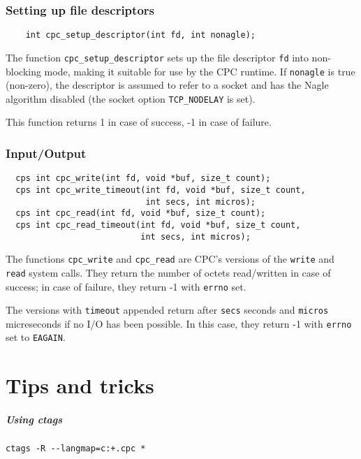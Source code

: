 \documentclass[a4paper]{report}
\begin{document}
\subsection{Setting up file descriptors}

\begin{verbatim}
    int cpc_setup_descriptor(int fd, int nonagle);
\end{verbatim}

The function \verb|cpc_setup_descriptor| sets up the file descriptor
\verb|fd| into non-blocking mode, making it suitable for use by the
CPC runtime.  If \verb|nonagle| is true (non-zero), the descriptor is
assumed to refer to a socket and has the Nagle algorithm disabled (the
socket option \verb|TCP_NODELAY| is set).

This function returns 1 in case of success, -1 in case of failure.

\subsection{Input/Output}
\begin{verbatim}
  cps int cpc_write(int fd, void *buf, size_t count);
  cps int cpc_write_timeout(int fd, void *buf, size_t count,
                            int secs, int micros);
  cps int cpc_read(int fd, void *buf, size_t count);
  cps int cpc_read_timeout(int fd, void *buf, size_t count,
                           int secs, int micros);
\end{verbatim}

The functions \verb|cpc_write| and \verb|cpc_read| are CPC's versions
of the \verb|write| and \verb|read| system calls.  They return the
number of octets read/written in case of success; in case of failure,
they return -1 with \verb|errno| set.

The versions with \verb|timeout| appended return after \verb|secs|
seconds and \verb|micros| micreseconds if no I/O has been possible.
In this case, they return -1 with \verb|errno| set to \verb|EAGAIN|.

\chapter{Tips and tricks}

\paragraph{Using ctags}
\begin{verbatim}
ctags -R --langmap=c:+.cpc *
\end{verbatim}
\end{document}
